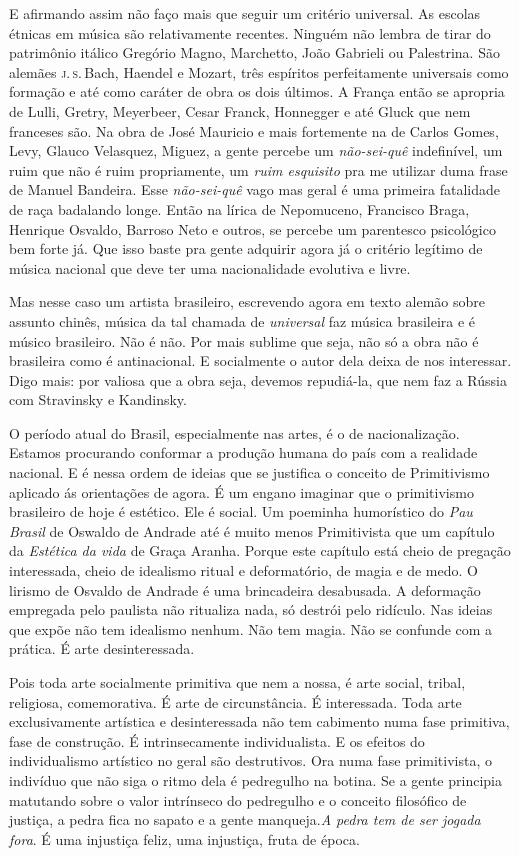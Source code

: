 E afirmando assim não faço mais que seguir um critério universal. As
escolas étnicas em música são relativamente recentes. Ninguém não lembra
de tirar do patrimônio itálico Gregório Magno, Marchetto, João Gabrieli
ou Palestrina. São alemães \textsc{j.\,s.}\,Bach, Haendel e Mozart, três espíritos
perfeitamente universais como formação e até como caráter de obra os
dois últimos. A França então se apropria de Lulli, Gretry, Meyerbeer,
Cesar Franck, Honnegger e até Gluck que nem franceses são. Na obra de
José Mauricio e mais fortemente na de Carlos Gomes, Levy, Glauco
Velasquez, Miguez, a gente percebe um \textit{não-sei-quê} indefinível, um ruim
que não é ruim propriamente, um \emph{ruim esquisito} pra me utilizar
duma frase de Manuel Bandeira. Esse \textit{não-sei-quê} vago mas geral é uma
primeira fatalidade de raça badalando longe. Então na lírica de
Nepomuceno, Francisco Braga, Henrique Osvaldo, Barroso Neto e outros, se
percebe um parentesco psicológico bem forte já. Que isso baste pra gente
adquirir agora já o critério legítimo de música nacional que deve ter
uma nacionalidade evolutiva e livre.

Mas nesse caso um artista brasileiro, escrevendo agora em texto alemão
sobre assunto chinês, música da tal chamada de \emph{universal} faz
música brasileira e é músico brasileiro. Não é não. Por mais sublime que
seja, não só a obra não é brasileira como é antinacional. E socialmente
o autor dela deixa de nos interessar. Digo mais: por valiosa que a obra
seja, devemos repudiá-la, que nem faz a Rússia com Stravinsky e
Kandinsky.

O período atual do Brasil, especialmente nas artes, é o de
nacionalização. Estamos procurando conformar a produção humana do país
com a realidade nacional. E é nessa ordem de ideias que se justifica o
conceito de Primitivismo aplicado ás orientações de agora. É um engano
imaginar que o primitivismo brasileiro de hoje é estético. Ele é social.
Um poeminha humorístico do \emph{Pau Brasil} de Oswaldo de Andrade até é
muito menos Primitivista que um capítulo da \emph{Estética da vida} de
Graça Aranha. Porque este capítulo está cheio de pregação interessada,
cheio de idealismo ritual e deformatório, de magia e de medo. O lirismo
de Osvaldo de Andrade é uma brincadeira desabusada. A deformação
empregada pelo paulista não ritualiza nada, só destrói pelo ridículo.
Nas ideias que expõe não tem idealismo nenhum. Não tem magia. Não se
confunde com a prática. É arte desinteressada.

Pois toda arte socialmente primitiva que nem a nossa, é arte social,
tribal, religiosa, comemorativa. É arte de circunstância. É interessada.
Toda arte exclusivamente artística e desinteressada não tem cabimento
numa fase primitiva, fase de construção. É intrinsecamente
individualista. E os efeitos do individualismo artístico no geral são
destrutivos. Ora numa fase primitivista, o indivíduo que não siga o
ritmo dela é pedregulho na botina. Se a gente principia matutando sobre
o valor intrínseco do pedregulho e o conceito filosófico de justiça, a
pedra fica no sapato e a gente manqueja.\textit{A pedra tem de ser jogada
fora}. É uma injustiça feliz, uma injustiça, fruta de época.

